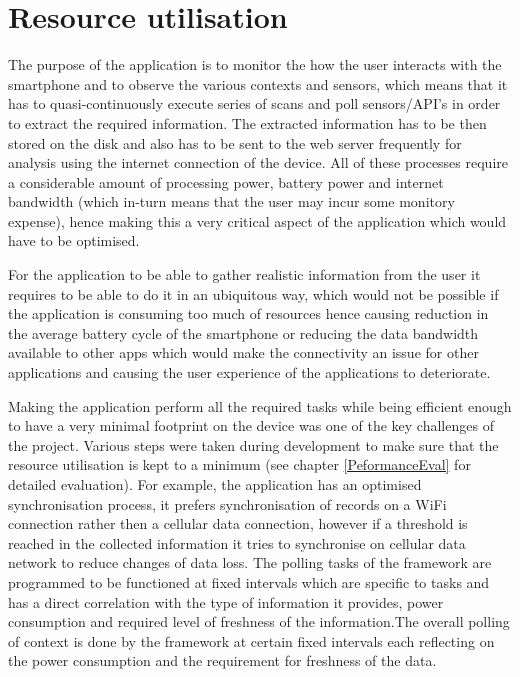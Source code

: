 \documentclass[12pt]{report}
\begin{document}
\section{Resource utilisation}

The purpose of the application is to monitor the how the user interacts with the smartphone and to observe the various contexts and sensors, which means that it has to quasi-continuously execute series of scans and poll sensors/API's in order to extract the required information. The extracted information has to be then stored on the disk and also has to be sent to the web server frequently for analysis using the internet connection of the device. All of these processes require a considerable amount of processing power, battery power and internet bandwidth (which in-turn means that the user may incur some monitory expense), hence making this a very critical aspect of the application which would have to be optimised.

For the application to be able to gather realistic information from the user it requires to be able to do it in an ubiquitous way, which would not be possible if the application is consuming too much of resources hence causing reduction in the average battery cycle of the smartphone or reducing the data bandwidth available to other apps which would make the connectivity an issue for other applications and causing the user experience of the applications to deteriorate. 

Making the application perform all the required tasks while being efficient enough to have a very minimal footprint on the device was one of the key challenges of the project. Various steps were taken during development to make sure that the resource utilisation is kept to a minimum (see chapter \ref{PeformanceEval} for detailed evaluation). For example, the application has an optimised synchronisation process, it prefers synchronisation of records on a WiFi connection rather then a cellular data connection, however if a threshold is reached in the collected information it tries to synchronise on cellular data network to reduce changes of data loss. The polling tasks of the framework are programmed to be functioned at fixed intervals which are specific to tasks and has a direct correlation with the type of information it provides, power consumption and required level of freshness of the information.The overall polling of context is done by the framework at certain fixed intervals each reflecting on the power consumption and the requirement for freshness of the data.
\end{document}
